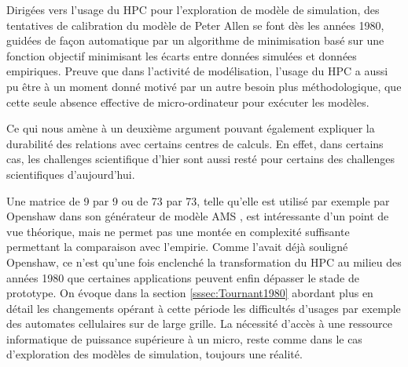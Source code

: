 Dirigées vers l'usage du HPC pour l'exploration de modèle de simulation, des tentatives de calibration du modèle de Peter Allen se font dès les années 1980, guidées de façon automatique par un algorithme de minimisation basé sur une fonction objectif minimisant les écarts entre données simulées et données empiriques. Preuve que dans l'activité de modélisation, l'usage du HPC a aussi pu être à un moment donné motivé par un autre besoin plus méthodologique, que cette seule absence effective de micro-ordinateur pour exécuter les modèles.

Ce qui nous amène à un deuxième argument pouvant également expliquer la durabilité des relations avec certains centres de calculs. En effet, dans certains cas, les challenges scientifique d'hier sont aussi resté pour certains des challenges scientifiques d'aujourd'hui.

Une matrice de 9 par 9 ou de 73 par 73, telle qu'elle est utilisé par exemple par Openshaw dans son générateur de modèle AMS \autocite[40]{Openshaw1988}, est intéressante d'un point de vue théorique, mais ne permet pas une montée en complexité suffisante permettant la comparaison avec l'empirie. Comme l'avait déjà souligné Openshaw, ce n'est qu'une fois enclenché la transformation du HPC au milieu des années 1980 que certaines applications peuvent enfin dépasser le stade de prototype. On évoque dans la section \ref{sssec:Tournant1980} abordant plus en détail les changements opérant à cette période les difficultés d'usages par exemple des automates cellulaires sur de large grille. La nécessité d'accès à une ressource informatique de puissance supérieure à un micro, reste comme dans le cas d'exploration des modèles de simulation, toujours une réalité.



